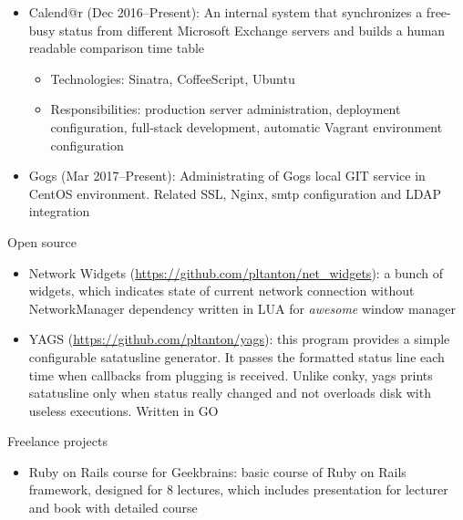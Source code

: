 \documentclass{cv}
\begin{document}
\begin{cvblock}{%
  }
\begin{itemize}
    \item Calend@r (Dec 2016--Present):
      An internal system that synchronizes a free-busy status from different
      Microsoft Exchange servers and builds a human readable comparison time
      table
      \begin{itemize}
        \item Technologies: Sinatra, CoffeeScript, Ubuntu
        \item Responsibilities: production server administration, deployment
          configuration, full-stack development, automatic Vagrant environment
          configuration
      \end{itemize}
    \item Gogs (Mar 2017--Present):
      Administrating of Gogs local GIT service in CentOS environment. Related
      SSL, Nginx, smtp configuration and LDAP integration

  \end{itemize}
\end{cvblock}

\vspace{2em}

\begin{cvblock}{Open source}
  \begin{itemize}
    \item Network Widgets
      (\url{https://github.com/pltanton/net_widgets}):
			a bunch of widgets, which indicates state of current network connection
      without NetworkManager dependency written in LUA for
      \textit{awesome} window manager
    \item YAGS
      (\url{https://github.com/pltanton/yags}):
      this program provides a simple configurable satatusline generator. It
      passes the formatted status line each time when callbacks from plugging
      is received. Unlike conky, yags prints satatusline only when status
      really changed and not overloads disk with useless executions. Written in 
      GO

  \end{itemize}
\end{cvblock}

\vspace{2em}

\begin{cvblock}{Freelance projects}
  \begin{itemize}
    \item Ruby on Rails course for Geekbrains:
      basic course of Ruby on Rails framework, designed for 8 lectures, which
      includes presentation for lecturer and book with detailed course
  \end{itemize}
\end{cvblock}
\end{document}
